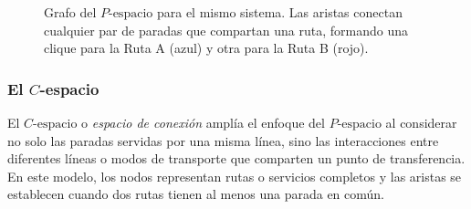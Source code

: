             \begin{figure}[H]
                \centering
                \caption{Grafo del $P\text{-espacio}$ para el mismo sistema. Las aristas conectan cualquier par de paradas que compartan una ruta, formando una clique para la Ruta A (azul) y otra para la Ruta B (rojo).}
                \label{fig:p_espacio}
            \end{figure}

            \subsubsection{El $C$-espacio}

                El $C\text{-espacio}$ o \textit{espacio de conexión} amplía el enfoque del $P\text{-espacio}$ al considerar no solo las paradas servidas por una misma línea, sino las interacciones entre diferentes líneas o modos de transporte que comparten un punto de transferencia. En este modelo, los nodos representan rutas o servicios completos y las aristas se establecen cuando dos rutas tienen al menos una parada en común.

